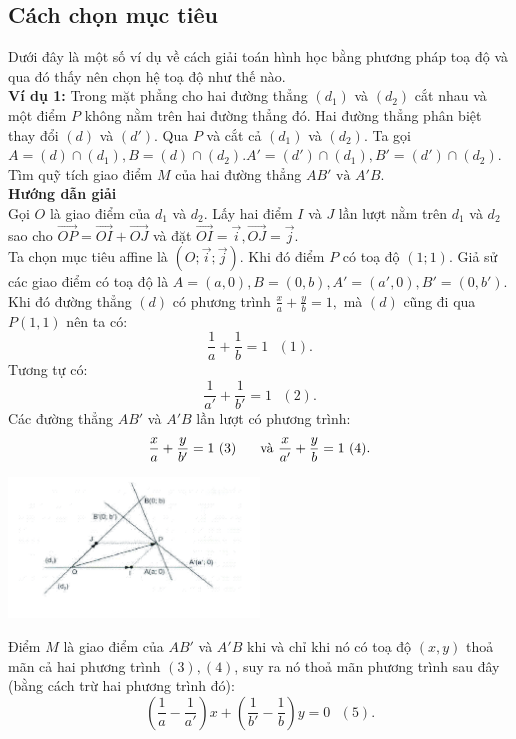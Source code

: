 \documentclass[12pt,a4]{article}
\begin{document}
\begin{titlepage}
\section{Cách chọn mục tiêu}
\vspace{0.2cm}
Dưới đây là một số ví dụ về cách giải toán hình học bằng phương pháp toạ độ và qua đó thấy nên chọn hệ toạ độ như thế nào.\\
\textbf{Ví dụ 1: }Trong mặt phẳng cho hai đường thẳng $(d_1)$ và $(d_2)$ cắt nhau và một điểm $P$ không nằm trên hai đường thẳng đó. Hai đường thẳng phân biệt thay đổi $(d)$ và $(d')$. Qua $P$ và cắt cả $(d_1)$ và $(d_2)$. Ta gọi $A = (d) \cap (d_1), B = (d) \cap (d_2). A' = (d') \cap (d_1), B' = (d') \cap (d_2).$ Tìm quỹ tích giao điểm $M$ của hai đường thẳng $AB' \text{ và } A'B$.\\
\textbf{Hướng dẫn giải}\\
Gọi $O$ là giao điểm của $d_1$ và $d_2$. Lấy hai điểm $I$ và $J$ lần lượt nằm trên $d_1$ và $d_2$ sao cho $\overrightarrow{OP} = \overrightarrow{OI} + \overrightarrow{OJ}$ và đặt $\overrightarrow{OI} = \vec{i}, \overrightarrow{OJ} = \vec{j}.$\\
Ta chọn mục tiêu affine là $(O; \vec{i}; \vec{j}).$ Khi đó điểm $P$ có toạ độ $(1; 1).$ Giả sử các giao điểm có toạ độ là $A = (a, 0), B = (0, b), A' = (a', 0), B' = (0, b').$ Khi đó đường thẳng $(d)$ có phương trình $\frac{x}{a} + \frac{y}{b} = 1,$ mà $(d)$ cũng đi qua $P(1,1)$ nên ta có:
\[
\frac{1}{a} + \frac{1}{b} = 1 \text{ }(1).
\]
Tương tự có:
\[
    \frac{1}{a'} + \frac{1}{b'} = 1 \text{ }(2).
\]
Các đường thẳng $AB'$ và $A'B$ lần lượt có phương trình:
\[
\frac{x}{a} + \frac{y}{b'} = 1 \text{ }(3) \hspace{0.5cm} \text{ và } \frac{x}{a'} + \frac{y}{b} = 1 \text{ }(4).
\]
\begin{center}
    \includegraphics[width=0.5\textwidth]{image/bt1.png}
\end{center}
Điểm $M$ là giao điểm của $AB'$ và $A'B$ khi và chỉ khi nó có toạ độ $(x,y)$ thoả mãn cả hai phương trình $(3), (4)$, suy ra nó thoả mãn phương trình sau đây (bằng cách trừ hai phương trình đó):
\[
(\frac{1}{a} - \frac{1}{a'})x + (\frac{1}{b'} - \frac{1}{b})y = 0 \text{ }(5).
\]
\end{titlepage}
\end{document}
